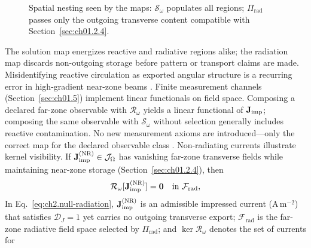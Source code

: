 \begin{figure}[t]
\centering
{}
\caption{Spatial nesting seen by the maps: \(\mathcal{S}_\omega\) populates all
regions; \(\Pi_{\mathrm{rad}}\) passes only the outgoing transverse content
compatible with Section~\ref{sec:ch01.2.4}.}
\label{fig:ch2.reactive-radiative-split}
\end{figure}
The solution map energizes reactive and radiative regions alike; the
radiation map discards non-outgoing storage before pattern or transport claims are
made. Misidentifying reactive circulation as exported angular structure is a
recurring error in high-gradient near-zone beams \cite{allen1992}. Finite measurement channels (Section~\ref{sec:ch01.5}) implement linear functionals
on field space. Composing a declared far-zone observable with \(\mathcal{R}_\omega\)
yields a linear functional of \(\mathbf{J}_{\mathrm{imp}}\); composing the same observable with
\(\mathcal{S}_\omega\) without selection generally includes reactive contamination.
No new measurement axioms are introduced---only the correct map for the declared
observable class \cite{stratton1941}. Non-radiating currents illustrate kernel visibility. If
\(\mathbf{J}_{\mathrm{imp}}^{\mathrm{(NR)}}\in\mathcal{J}_\Omega\) has vanishing far-zone transverse
fields while maintaining near-zone storage (Section~\ref{sec:ch01.2.4}), then
\begin{equation}
\label{eq:ch2.null-radiation}
\mathcal{R}_\omega[\mathbf{J}_{\mathrm{imp}}^{\mathrm{(NR)}}]=\mathbf{0}
\quad\text{in}\ \mathcal{F}_{\mathrm{rad}},
\end{equation}
In Eq.~\eqref{eq:ch2.null-radiation},
\(\mathbf{J}_{\mathrm{imp}}^{\mathrm{(NR)}}\) is an admissible impressed current (A\,m\(^{-2}\)) that satisfies
\(\mathcal{D}_{J}=1\) yet carries no outgoing transverse export;
\(\mathcal{F}_{\mathrm{rad}}\) is the far-zone radiative field space selected by
\(\Pi_{\mathrm{rad}}\); and \(\ker\mathcal{R}_\omega\) denotes the set of currents for

